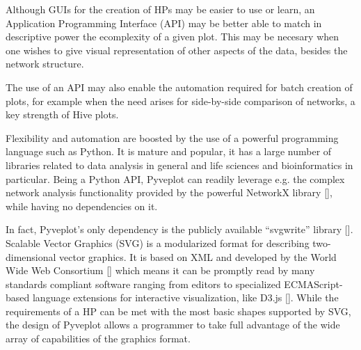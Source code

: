 \documentclass{bioinfo}
\begin{document}
Although GUIs for the creation of HPs may be easier to use or learn,
an Application Programming Interface (API) may be better able to match
in descriptive power the ecomplexity of a given plot. This may be
necesary when one wishes to give visual representation of other
aspects of the data, besides the network structure.

The use of an API may also enable the automation required for batch
creation of plots, for example when the need arises for side-by-side
comparison of networks, a key strength of Hive plots.

Flexibility and automation are boosted by the use of a powerful
programming language such as Python. It is mature and popular, it has
a large number of libraries related to data analysis in general and
life sciences and bioinformatics in particular. Being a Python API,
Pyveplot can readily leverage e.g. the complex network analysis
functionality provided by the powerful NetworkX library
[\cite{hagberg-2008-exploring}], while having no dependencies on it.

In fact, Pyveplot's only dependency is the publicly available ``svgwrite''
library [\cite{svgwrite}]. Scalable Vector Graphics (SVG) is a
modularized format for describing two-dimensional vector graphics. It
is based on XML and developed by the World Wide Web Consortium
[\cite{McCormack:11:SVG}] which means it can be promptly read by many
standards compliant software ranging from editors to specialized
ECMAScript-based language extensions for interactive visualization,
like D3.js [\cite{bostock2011d3}]. While the requirements of a HP can
be met with the most basic shapes supported by SVG, the design of
Pyveplot allows a programmer to take full advantage of the wide array
of capabilities of the graphics format.
\end{document}
